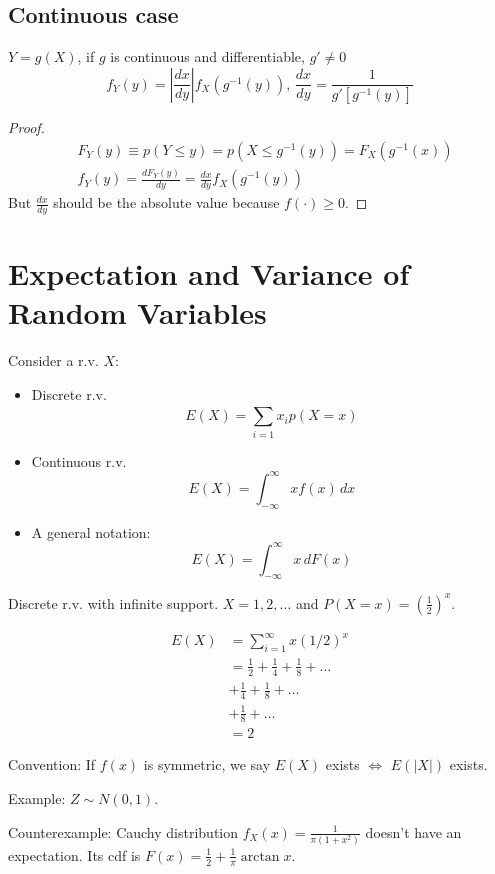 \subsection{Continuous case} $Y = g(X)$, if $g$ is continuous and differentiable, $g'\neq 0$ \[
    f_Y(y) = \left| \frac{dx}{dy}\right| f_X(g^{-1}(y)) , \, \frac{dx}{dy} = \frac{1}{g'[g^{-1}(y)]}
\]

\begin{proof}
    \begin{align*}
         & F_Y(y) \equiv p(Y \leq y) = p(X \leq g^{-1}(y)) = F_X(g^{-1}(x)) \\
         & f_Y(y) = \frac{d F_Y(y)}{dy} = \frac{dx}{dy} f_X(g^{-1}(y))
    \end{align*}
    But $\frac{dx}{dy}$ should be the absolute value because $f(\cdot) \geq 0$.
\end{proof}

\section{Expectation and Variance of Random Variables}

\begin{definition}
    [Expectation]

    Consider a r.v. $X$:

    \begin{itemize}
        \item Discrete r.v. \[
                  E(X) = \sum_{i=1}^{} x_i p(X=x)
              \]
        \item Continuous r.v. \[
                  E(X) = \int_{-\infty }^{\infty } xf(x) \, dx
              \]
        \item A general notation: \[
                  E(X) = \int_{-\infty }^{\infty } x \, dF(x)
              \]
    \end{itemize}
\end{definition}

\begin{example*}
    Discrete r.v. with infinite support. $X = 1,2,\dots$ and $P(X=x) = (\frac{1}{2})^{x}$.

    \begin{align*}
        E(X) & = \sum_{i=1}^{\infty } x(1/2)^{x}                 \\
             & = \frac{1}{2} + \frac{1}{4} + \frac{1}{8} + \dots \\
             & +\frac{1}{4} + \frac{1}{8} + \dots                \\
             & + \frac{1}{8} + \dots                             \\
             & = 2
    \end{align*}

    Convention: If $f(x)$ is symmetric, we say $E(X)$ exists $\iff$ $E(\left| X \right| )$ exists.

    Example: $Z \sim N(0,1)$.

    Counterexample: Cauchy distribution $f_X(x) = \frac{1}{\pi (1+x ^{2})}$ doesn't have an expectation. Its cdf is $F(x) = \frac{1}{2} + \frac{1}{\pi }\arctan x$.
\end{example*}


